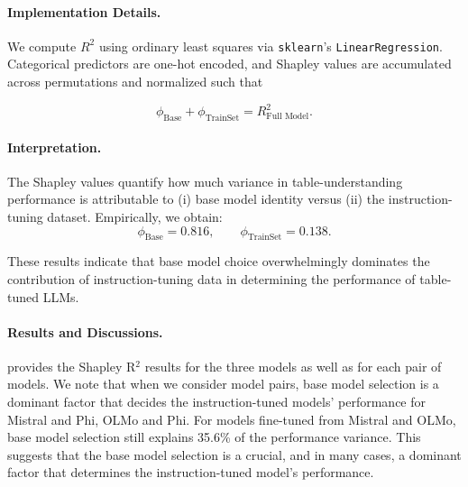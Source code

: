 \documentclass[11pt]{article}
\begin{document}
\paragraph{Implementation Details.}

We compute $R^{2}$ using ordinary least squares via \texttt{sklearn}'s \texttt{LinearRegression}. Categorical predictors are one-hot encoded, and Shapley values are accumulated across permutations and normalized such that

\[
\phi_{\text{Base}} + \phi_{\text{TrainSet}} = R^2_{\text{Full Model}}.
\]

\paragraph{Interpretation.}

The Shapley values quantify how much variance in table-understanding performance is attributable to (i) base model identity versus (ii) the instruction-tuning dataset. Empirically, we obtain:
\[
\phi_{\text{Base}} = 0.816, \qquad
\phi_{\text{TrainSet}} = 0.138.
\]

These results indicate that base model choice overwhelmingly dominates the contribution of instruction-tuning data in determining the performance of table-tuned LLMs.


\paragraph{Results and Discussions.}
 provides the Shapley R$^2$ results for the three models as well as for each pair of models.
We note that when we consider model pairs, base model selection is a dominant factor that decides the instruction-tuned models' performance for Mistral and Phi, OLMo and Phi.
For models fine-tuned from Mistral and OLMo, base model selection still explains 35.6\% of the performance variance. 
This suggests that the base model selection is a crucial, and in many cases, a dominant factor that determines the instruction-tuned model's performance.



\end{document}
